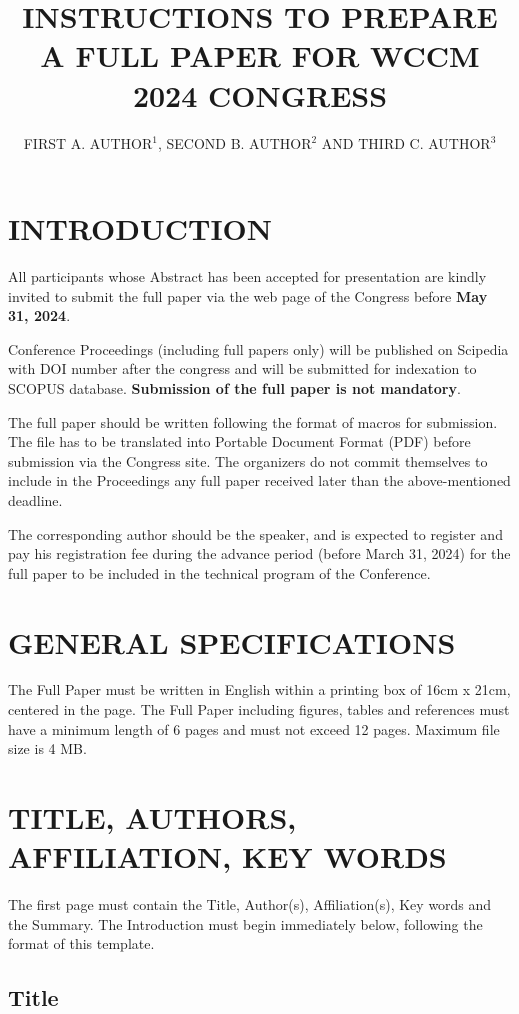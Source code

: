 \documentclass{wccm2024}
\title{INSTRUCTIONS TO PREPARE A FULL PAPER  FOR WCCM 2024 CONGRESS}
\author{FIRST A. AUTHOR$^{1}$, SECOND B. AUTHOR$^{2}$ AND THIRD C. AUTHOR$^{3}$}
\begin{document}
\thispagestyle{empty}

\section{INTRODUCTION}

All participants whose Abstract has been accepted for presentation are kindly invited to submit the full paper via the web page of the Congress before \textbf{May 31, 2024}.

Conference Proceedings (including full papers only) will be published on Scipedia with DOI number after the congress and will be submitted for indexation to SCOPUS database. \textbf{Submission of the full paper is not mandatory}.

The full paper should be written following the format of macros for submission. The file has to be translated into Portable Document Format (PDF) before submission via the Congress site. The organizers do not commit themselves to include in the Proceedings any full paper received later than the above-mentioned deadline.

The corresponding author should be the speaker, and is expected to register and pay his registration fee during the advance period (before March 31, 2024) for the full paper to be included in the technical program of the Conference.


\section{GENERAL SPECIFICATIONS}

The Full Paper must be written in English within a printing box of 16cm x 21cm, centered in the page. The Full Paper including figures, tables and references must have a minimum length of 6 pages and must not exceed 12 pages. Maximum file size is 4 MB.

\section{TITLE, AUTHORS, AFFILIATION, KEY WORDS}

The first page must contain the Title, Author(s), Affiliation(s),
Key words and the Summary. The Introduction must begin immediately
below, following the format of this template.

\subsection{Title}
\end{document}
